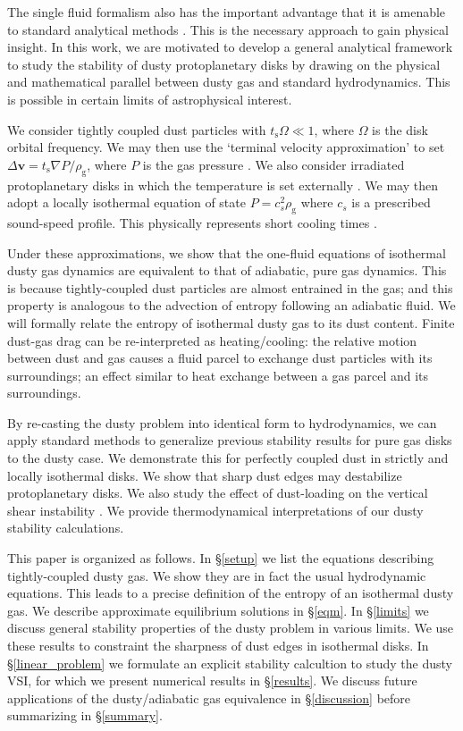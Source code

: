 \documentclass[iop, numberedappendix]{emulateapj}
\newcommand{\rhog}{\rho_\mathrm{g}}
\newcommand{\tstop}{t_\mathrm{s}}
\begin{document}
The single fluid formalism also has the important advantage that it is
amenable to standard analytical methods
\citep{youdin05a,jacquet11}. This is the necessary  approach to gain physical insight.  
In this work, we are motivated to develop a general analytical
framework to  study the stability of dusty protoplanetary disks by
drawing on the physical and mathematical parallel between dusty gas and standard
hydrodynamics. This is possible in certain limits of astrophysical
interest.  

We consider tightly coupled dust particles with $\tstop\Omega\ll
1$, where $\Omega$ is the disk orbital frequency. We may then use the
`terminal velocity approximation' to set $\Delta \bm{v} = \tstop\nabla
P/\rhog$, where $P$ is the gas pressure \citep{youdin05a,
  jacquet11,laibe14}. We also consider irradiated protoplanetary disks 
in which the temperature is set externally \citep{chiang97,stam08}. We
may then adopt a locally isothermal equation of state $P = c_s^2\rhog$
where $c_s$ is a prescribed sound-speed profile.  This physically
represents short cooling times \citep{lin15}. 

Under these approximations, we show that the one-fluid equations of 
isothermal dusty gas dynamics are equivalent to that of adiabatic, pure gas
dynamics. This is because tightly-coupled dust particles are almost
entrained in the gas; and this property is analogous to the advection
of entropy following an adiabatic fluid. We will formally relate the
entropy of isothermal dusty gas to its dust content. Finite 
dust-gas drag can be re-interpreted as heating/cooling: the relative
motion between dust and gas causes a fluid parcel to exchange dust
particles with its surroundings; an effect similar to heat exchange
between a gas parcel and its surroundings.   


By re-casting the dusty problem into identical form to 
hydrodynamics, we can apply standard methods to generalize previous stability 
results for pure gas disks to the dusty case. We demonstrate this for
perfectly coupled dust in strictly and locally isothermal disks. We
show that sharp dust edges may destabilize protoplanetary disks.  
We also study the effect of dust-loading on the vertical shear
instability \citep[VSI,][]{nelson13,lin15,barker15}. We provide 
thermodynamical interpretations of our dusty stability calculations. 

This paper is organized as follows. In \S\ref{setup} we list the
equations describing tightly-coupled dusty gas. We show they are in 
fact the usual hydrodynamic equations. This leads to a precise 
definition of the entropy of an isothermal dusty gas. We describe approximate 
equilibrium solutions in \S\ref{eqm}. In \S\ref{limits} we discuss
general stability properties of the dusty problem in various
limits. We use these results to constraint the sharpness of dust edges
in isothermal disks. In \S\ref{linear_problem} we formulate an
explicit stability calcultion to study the dusty VSI, for which we
present numerical results in \S\ref{results}. We 
discuss future applications of the dusty/adiabatic gas equivalence in 
\S\ref{discussion} before summarizing in \S\ref{summary}. 






\appendix




\end{document}
